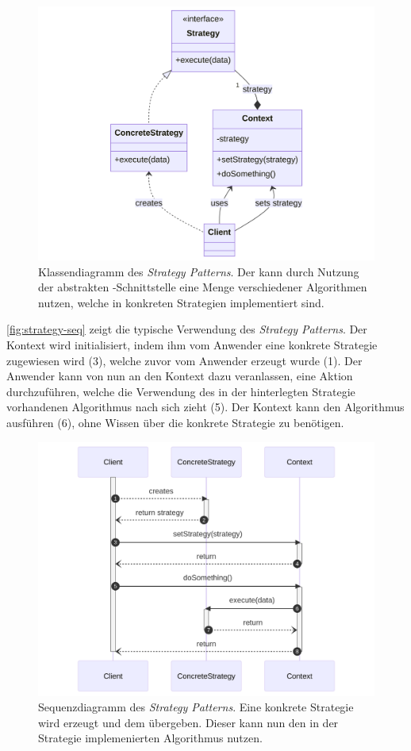 \begin{figure}[!ht]
	\centering
	\includegraphics[width=0.75\linewidth]{images/patterns/strategy-class.png}
	\caption{Klassendiagramm des \emph{Strategy Patterns}. Der  kann durch Nutzung der abstrakten -Schnittstelle eine Menge verschiedener Algorithmen nutzen, welche in konkreten Strategien implementiert sind. \cite{skobeleva_strategy_2023}}
	\label{fig:strategy-class}
\end{figure}

\autoref{fig:strategy-seq} zeigt die typische Verwendung des \emph{Strategy Patterns}. Der Kontext wird initialisiert, indem ihm vom Anwender eine konkrete Strategie zugewiesen wird (3), welche zuvor vom Anwender erzeugt wurde (1). Der Anwender kann von nun an den Kontext dazu veranlassen, eine Aktion durchzuführen, welche die Verwendung des in der hinterlegten Strategie vorhandenen Algorithmus nach sich zieht (5). Der Kontext kann den Algorithmus ausführen (6), ohne Wissen über die konkrete Strategie zu benötigen.

\begin{figure}[!ht]
	\centering
	\includegraphics[width=0.75\linewidth]{images/patterns/strategy-seq.png}
	\caption{Sequenzdiagramm des \emph{Strategy Patterns}. Eine konkrete Strategie wird erzeugt und dem  übergeben. Dieser kann nun den in der Strategie implemenierten Algorithmus nutzen. \cite{skobeleva_strategy_2023}}
	\label{fig:strategy-seq}
\end{figure}


